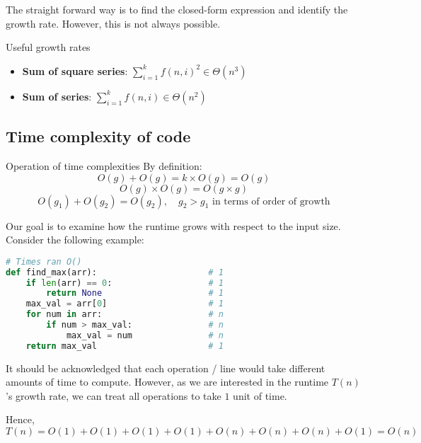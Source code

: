 The straight forward way is to find the closed-form expression and identify the growth rate. However, this is not always possible.

\begin{knBox}
    {Useful growth rates}
    \begin{itemize}
        \item \textbf{Sum of square series}: $\sum_{i=1}^{k}f(n, i)^2\in \Theta(n^3)$
        \item \textbf{Sum of series}: $\sum_{i=1}^{k}f(n, i)\in \Theta(n^2)$
    \end{itemize}
\end{knBox}

\subsection{Time complexity of code}

\begin{knBox}
    {Operation of time complexities}
    By definition:
    \[O(g)+O(g)=k\times O(g)=O(g)\]
    \[O(g)\times O(g)=O(g\times g)\]
    \[O(g_1)+O(g_2)=O(g_2),\quad g_2 > g_1\text{ in terms of order of growth}\]
\end{knBox}

Our goal is to examine how the runtime grows with respect to the input size. Consider the following example:

\begin{lstlisting}[language=Python]
                                        # Times ran O()
def find_max(arr):                      # 1
    if len(arr) == 0:                   # 1
        return None                     # 1
    max_val = arr[0]                    # 1
    for num in arr:                     # n
        if num > max_val:               # n
            max_val = num               # n
    return max_val                      # 1
\end{lstlisting}

It should be acknowledged that each operation / line would take different amounts of time to compute. However, as we are interested in the runtime $T(n)$'s growth rate, we can treat all operations to take $1$ unit of time.

Hence, $T(n)=O(1)+O(1)+O(1)+O(1)+O(n)+O(n)+O(n)+O(1)=O(n)$

